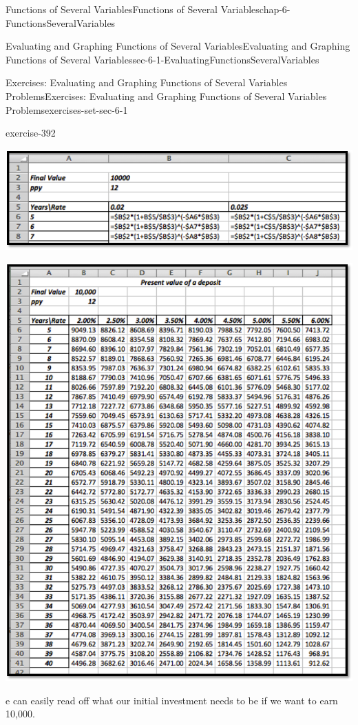 \documentclass[oneside,10pt,]{book}
\numberwithin{equation}{section}
\begin{document}
\begin{chapterptx}{Functions of Several Variables}{}{Functions of Several Variables}{}{}{chap-6-FunctionsSeveralVariables}
\begin{sectionptx}{Evaluating and Graphing Functions of Several Variables}{}{Evaluating and Graphing Functions of Several Variables}{}{}{sec-6-1-EvaluatingFunctionsSeveralVariables}
\begin{exercises-subsection-numberless}{Exercises: Evaluating and Graphing Functions of Several Variables Problems}{}{Exercises: Evaluating and Graphing Functions of Several Variables Problems}{}{}{exercises-set-sec-6-1}
\begin{exercisegroup}
\begin{divisionexerciseeg}{15}{}{}{exercise-392}
\begin{sidebyside}{1}{0.05}{0.05}{0}
\begin{sbspanel}{0.9}%
\includegraphics[width=1\linewidth]{images/sec6-1-sol15a.png}
\end{sbspanel}%
\end{sidebyside}%
\begin{sidebyside}{1}{0}{0}{0}%
\begin{sbspanel}{1}%
\includegraphics[width=1\linewidth]{images/sec6-1-sol15b.png}
\end{sbspanel}%
\end{sidebyside}%
\par
\hypertarget{p-2198}{}%
e can easily read off what our initial investment needs to be if we want to earn \textdollar{}10,000.%
\end{divisionexerciseeg}%

\end{exercisegroup}
\end{exercises-subsection-numberless}
\end{sectionptx}
\end{chapterptx}
\end{document}
